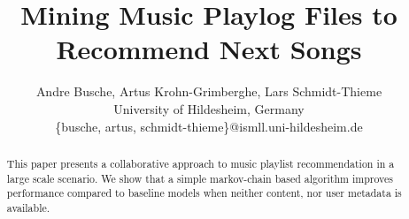 \documentclass[a4paper]{article}
\begin{document}
\newcommand{\argmax}{\text{arg max}}
\newcommand{\avg}{\text{avg}}



\title{Mining Music Playlog Files to Recommend Next Songs}
%
%
\author{Andre Busche, Artus Krohn-Grimberghe, Lars Schmidt-Thieme \\
University of Hildesheim, Germany\\
\{busche, artus, schmidt-thieme\}@ismll.uni-hildesheim.de}

%
%



\maketitle              

\setcounter{footnote}{0}

\begin{abstract} 

This paper presents a collaborative approach to music playlist recommendation in a large scale scenario.
We show that a simple markov-chain based algorithm improves performance compared to baseline models when neither content, nor user metadata is available.	


\end{abstract} 










\end{document}
